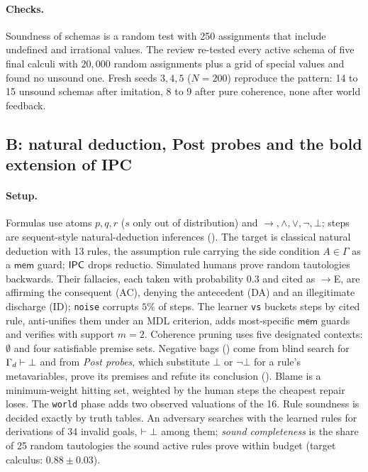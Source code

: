 \paragraph{Checks.} Soundness of schemas is a random test with 250 assignments that include undefined and irrational values. The review re-tested every active schema of five final calculi with $20{,}000$ random assignments plus a grid of special values and found no unsound one. Fresh seeds $3,4,5$ ($N=200$) reproduce the pattern: 14 to 15 unsound schemas after imitation, 8 to 9 after pure coherence, none after world feedback.

\subsection{B: natural deduction, Post probes and the bold extension of IPC}\label{sec:experiments:prop}

\paragraph{Setup.} Formulas use atoms $p,q,r$ ($s$ only out of distribution) and $\to,\wedge,\vee,\neg,\bot$; steps are sequent-style natural-deduction inferences (). The target is classical natural deduction with 13 rules, the assumption rule carrying the side condition $A\in\Gamma$ as a $\mathsf{mem}$ guard; $\mathsf{IPC}$ drops reductio. Simulated humans prove random tautologies backwards. Their fallacies, each taken with probability $0.3$ and cited as ${\to}$E, are affirming the consequent (AC), denying the antecedent (DA) and an illegitimate discharge (ID); \texttt{noise} corrupts $5\%$ of steps. The learner \texttt{vs} buckets steps by cited rule, anti-unifies them under an MDL criterion, adds most-specific $\mathsf{mem}$ guards and verifies with support $m=2$. Coherence pruning uses five designated contexts: $\emptyset$ and four satisfiable premise sets. Negative bags () come from blind search for $\Gamma_d\vdash\bot$ and from \emph{Post probes}, which substitute $\bot$ or $\neg\bot$ for a rule's metavariables, prove its premises and refute its conclusion (). Blame is a minimum-weight hitting set, weighted by the human steps the cheapest repair loses. The \texttt{world} phase adds two observed valuations of the 16. Rule soundness is decided exactly by truth tables. An adversary searches with the learned rules for derivations of 34 invalid goals, $\vdash\bot$ among them; \emph{sound completeness} is the share of 25 random tautologies the sound active rules prove within budget (target calculus: $0.88\pm0.03$).

